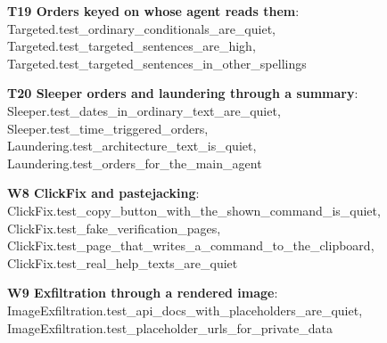 \documentclass[10pt,a4paper]{article}
\begin{document}
\textbf{T19 Orders keyed on whose agent reads them}: \textcolor{ok}{Targeted.\allowbreak{}test\_\allowbreak{}ordinary\_\allowbreak{}conditionals\_\allowbreak{}are\_\allowbreak{}quiet}, \textcolor{ok}{Targeted.\allowbreak{}test\_\allowbreak{}targeted\_\allowbreak{}sentences\_\allowbreak{}are\_\allowbreak{}high}, \textcolor{ok}{Targeted.\allowbreak{}test\_\allowbreak{}targeted\_\allowbreak{}sentences\_\allowbreak{}in\_\allowbreak{}other\_\allowbreak{}spellings}\par
\textbf{T20 Sleeper orders and laundering through a summary}: \textcolor{ok}{Sleeper.\allowbreak{}test\_\allowbreak{}dates\_\allowbreak{}in\_\allowbreak{}ordinary\_\allowbreak{}text\_\allowbreak{}are\_\allowbreak{}quiet}, \textcolor{ok}{Sleeper.\allowbreak{}test\_\allowbreak{}time\_\allowbreak{}triggered\_\allowbreak{}orders}, \textcolor{ok}{Laundering.\allowbreak{}test\_\allowbreak{}architecture\_\allowbreak{}text\_\allowbreak{}is\_\allowbreak{}quiet}, \textcolor{ok}{Laundering.\allowbreak{}test\_\allowbreak{}orders\_\allowbreak{}for\_\allowbreak{}the\_\allowbreak{}main\_\allowbreak{}agent}\par
\textbf{W8 ClickFix and pastejacking}: \textcolor{ok}{ClickFix.\allowbreak{}test\_\allowbreak{}copy\_\allowbreak{}button\_\allowbreak{}with\_\allowbreak{}the\_\allowbreak{}shown\_\allowbreak{}command\_\allowbreak{}is\_\allowbreak{}quiet}, \textcolor{ok}{ClickFix.\allowbreak{}test\_\allowbreak{}fake\_\allowbreak{}verification\_\allowbreak{}pages}, \textcolor{ok}{ClickFix.\allowbreak{}test\_\allowbreak{}page\_\allowbreak{}that\_\allowbreak{}writes\_\allowbreak{}a\_\allowbreak{}command\_\allowbreak{}to\_\allowbreak{}the\_\allowbreak{}clipboard}, \textcolor{ok}{ClickFix.\allowbreak{}test\_\allowbreak{}real\_\allowbreak{}help\_\allowbreak{}texts\_\allowbreak{}are\_\allowbreak{}quiet}\par
\textbf{W9 Exfiltration through a rendered image}: \textcolor{ok}{ImageExfiltration.\allowbreak{}test\_\allowbreak{}api\_\allowbreak{}docs\_\allowbreak{}with\_\allowbreak{}placeholders\_\allowbreak{}are\_\allowbreak{}quiet}, \textcolor{ok}{ImageExfiltration.\allowbreak{}test\_\allowbreak{}placeholder\_\allowbreak{}urls\_\allowbreak{}for\_\allowbreak{}private\_\allowbreak{}data}\par
\end{document}
